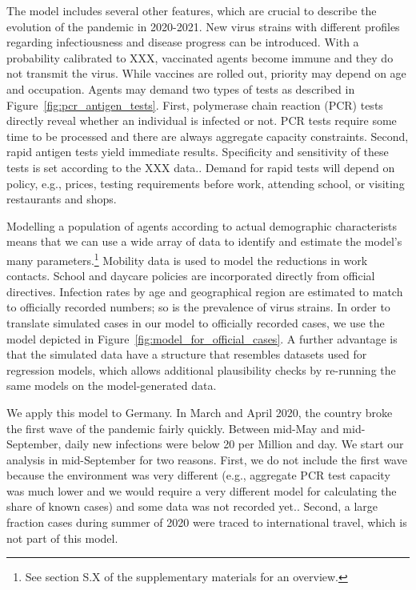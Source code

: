 The model includes several other features, which are crucial to describe the evolution of the pandemic in 2020-2021. New virus strains with different profiles regarding infectiousness and disease progress can be introduced. With a probability calibrated to XXX, vaccinated agents become immune and they do not transmit the virus. While vaccines are rolled out, priority may depend on age and occupation. Agents may demand two types of tests as described in Figure~\ref{fig:pcr_antigen_tests}. First, polymerase chain reaction (PCR) tests directly reveal whether an individual is infected or not. PCR tests require some time to be processed and there are always aggregate capacity constraints. Second, rapid antigen tests yield immediate results. Specificity and sensitivity of these tests is set according to the XXX data.. Demand for rapid tests will depend on policy, e.g., prices, testing requirements before work, attending school, or visiting restaurants and shops.

Modelling a population of agents according to actual demographic characterists means that we can use a wide array of data to identify and estimate the model's many parameters.\footnote{See section S.X of the supplementary materials for an overview.} Mobility data is used to model the reductions in work contacts. School and daycare policies are incorporated directly from official directives. Infection rates by age and geographical region are estimated to match to officially recorded numbers; so is the prevalence of virus strains. In order to translate simulated cases in our model to officially recorded cases, we use the model depicted in Figure~\ref{fig:model_for_official_cases}.  A further advantage is that the simulated data have a structure that resembles datasets used for regression models, which allows additional plausibility checks by re-running the same models on the model-generated data.

We apply this model to Germany. In March and April 2020, the country broke the first wave of the pandemic fairly quickly. Between mid-May and mid-September, daily new infections were below 20 per Million and day. We start our analysis in mid-September for two reasons. First, we do not include the first wave because the environment was very different (e.g., aggregate PCR test capacity was much lower and we would require a very different model for calculating the share of known cases) and some data was not recorded yet.. Second, a large fraction cases during summer of 2020 were traced to international travel, which is not part of this model. 

